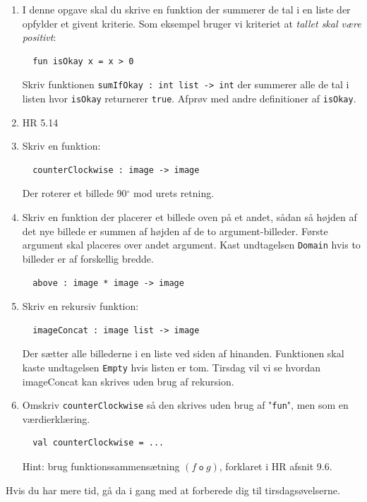 \documentclass[a4paper,12pt]{article}
\begin{document}
\begin{enumerate}[{3}M1]
\item I denne opgave skal du skrive en funktion der summerer de tal i
  en liste der opfylder et givent kriterie. Som eksempel bruger vi
  kriteriet at \textit{tallet skal være positivt}:
\begin{lstlisting}
  fun isOkay x = x > 0
\end{lstlisting}

Skriv funktionen \verb|sumIfOkay : int list -> int| der summerer alle
de tal i listen hvor \verb|isOkay| returnerer \verb|true|. Afprøv med andre
definitioner af \verb|isOkay|.

\item HR 5.14

\item Skriv en funktion:
\begin{lstlisting}
  counterClockwise : image -> image
\end{lstlisting}
  Der roterer et billede 90$^\circ$ mod urets retning.

\item Skriv en funktion der placerer et billede oven på et andet,
  sådan så højden af det nye billede er summen af højden af de to
  argument-billeder. Første argument skal placeres over andet
  argument. Kast undtagelsen \verb|Domain| hvis to billeder er af
  forskellig bredde.
\begin{lstlisting}
  above : image * image -> image
\end{lstlisting}


\item Skriv en rekursiv funktion:
\begin{lstlisting}
  imageConcat : image list -> image
\end{lstlisting}
  Der sætter alle billederne i en liste ved siden af
  hinanden. Funktionen skal kaste undtagelsen \verb|Empty| hvis listen
  er tom. Tirsdag vil vi se hvordan imageConcat kan skrives uden brug
  af rekursion.

\item Omskriv \verb|counterClockwise| så den skrives uden brug af
  "\texttt{fun}", men som en værdierklæring.
\begin{lstlisting}
  val counterClockwise = ...
\end{lstlisting}
  Hint: brug funktionssammensætning $(f~\texttt{o}~g)$, forklaret i HR
  afsnit 9.6.
\end{enumerate}
\vspace{5mm}
Hvis du har mere tid, gå da i gang med at forberede dig til
tirsdagsøvelserne.
\end{document}
